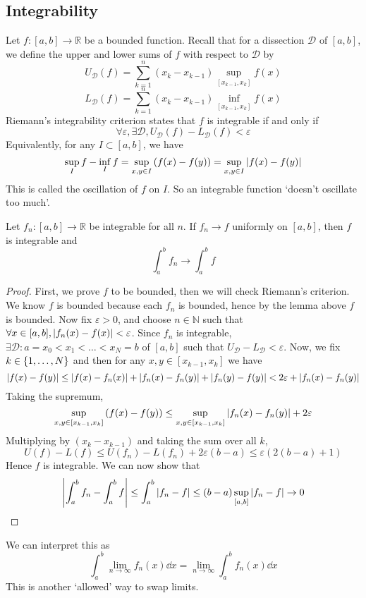 \subsection{Integrability}
Let \( f \colon [a, b] \to \mathbb R \) be a bounded function.
Recall that for a dissection \( \mathcal D \) of \( [a, b] \), we define the upper and lower sums of \( f \) with respect to \( \mathcal D \) by
\[
	U_{\mathcal D}(f) = \sum_{k=1}^n (x_k - x_{k-1}) \sup_{[x_{k-1}, x_k]} f(x)
\]
\[
	L_{\mathcal D}(f) = \sum_{k=1}^n (x_k - x_{k-1}) \inf_{[x_{k-1}, x_k]} f(x)
\]
Riemann's integrability criterion states that \( f \) is integrable if and only if
\[
	\forall \varepsilon, \exists \mathcal D, U_{\mathcal D}(f) - L_{\mathcal D}(f) < \varepsilon
\]
Equivalently, %
for any \( I \subset [a, b] \), we have
\[
	\sup_I f - \inf_I f = \sup_{x,y \in I} \qty(f(x) - f(y)) = \sup_{x,y \in I} \abs{f(x) - f(y)}
\]
This is called the oscillation of \( f \) on \( I \).
So an integrable function `doesn't oscillate too much'.

\begin{theorem}
	Let \( f_n \colon [a,b] \to \mathbb R \) be integrable for all \( n \).
	If \( f_n \to f \) uniformly on \( [a,b] \), then \( f \) is integrable and
	\[
		\int_a^b f_n \to \int_a^b f
	\]
\end{theorem}
\begin{proof}
	First, we prove \( f \) to be bounded, then we will check Riemann's criterion.
	We know \( f \) is bounded because each \( f_n \) is bounded, hence by the lemma above \( f \) is bounded.
	Now fix \( \varepsilon > 0 \), and choose \( n \in \mathbb N \) such that \( \forall x \in [a,b], \abs{f_n(x) - f(x)} < \varepsilon \).
	Since \( f_n \) is integrable, \( \exists \mathcal D \colon a = x_0 < x_1 < \dots < x_N = b \) of \( [a,b] \) such that \( U_{\mathcal D} - L_{\mathcal D} < \varepsilon \).
	Now, we fix \( k \in \qty{1,\dots,N} \) and then for any \( x,y \in [x_{k-1}, x_k] \) we have
	\[
		\abs{f(x) - f(y)} \leq \abs{f(x) - f_n(x)} + \abs{f_n(x) - f_n(y)} + \abs{f_n(y) - f(y)} < 2\varepsilon + \abs{f_n(x) - f_n(y)}
	\]
	Taking the supremum,
	\[
		\sup_{x,y \in [x_{k-1},x_k]} \qty(f(x) - f(y)) \leq \sup_{x,y \in [x_{k-1},x_k]} \abs{f_n(x) - f_n(y)} + 2\varepsilon
	\]
	Multiplying by \( (x_k - x_{k-1}) \) and taking the sum over all \( k \),
	\[
		U(f) - L(f) \leq U(f_n) - L(f_n) + 2\varepsilon (b-a) \leq \varepsilon (2(b-a) + 1)
	\]
	Hence \( f \) is integrable.
	We can now show that
	\[
		\abs{\int_a^b f_n - \int_a^b f} \leq \int_a^b \abs{f_n - f} \leq (b-a) \sup_{[a,b]} \abs{f_n - f} \to 0
	\]
\end{proof}
\begin{remark}
	We can interpret this as
	\[
		\int_a^b \lim_{n \to \infty} f_n(x) \dd{x} = \lim_{n \to \infty} \int_a^b f_n(x) \dd{x}
	\]
	This is another `allowed' way to swap limits.
\end{remark}


